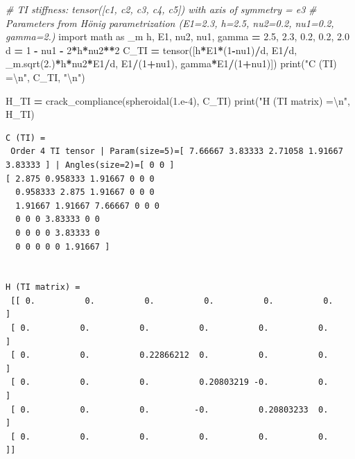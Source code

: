 \documentclass[
  a4paper,
  numbers=noendperiod,
  DIV=12]{scrreprt}
\newenvironment{Shaded}{\begin{snugshade}}{\end{snugshade}}
\newcommand{\BuiltInTok}[1]{#1}
\newcommand{\CharTok}[1]{\textcolor[rgb]{0.31,0.60,0.02}{#1}}
\newcommand{\CommentTok}[1]{\textcolor[rgb]{0.56,0.35,0.01}{\textit{#1}}}
\newcommand{\DecValTok}[1]{\textcolor[rgb]{0.00,0.00,0.81}{#1}}
\newcommand{\FloatTok}[1]{\textcolor[rgb]{0.00,0.00,0.81}{#1}}
\newcommand{\ImportTok}[1]{#1}
\newcommand{\NormalTok}[1]{#1}
\newcommand{\OperatorTok}[1]{\textcolor[rgb]{0.81,0.36,0.00}{\textbf{#1}}}
\newcommand{\StringTok}[1]{\textcolor[rgb]{0.31,0.60,0.02}{#1}}
\begin{document}
\begin{Shaded}
\begin{Highlighting}[]
\CommentTok{\# TI stiffness: tensor([c1, c2, c3, c4, c5]) with axis of symmetry = e3}
\CommentTok{\# Parameters from Hönig parametrization (E1=2.3, h=2.5, nu2=0.2, nu1=0.2, gamma=2.)}
\ImportTok{import}\NormalTok{ math }\ImportTok{as}\NormalTok{ \_m}
\NormalTok{h, E1, nu2, nu1, gamma }\OperatorTok{=} \FloatTok{2.5}\NormalTok{, }\FloatTok{2.3}\NormalTok{, }\FloatTok{0.2}\NormalTok{, }\FloatTok{0.2}\NormalTok{, }\FloatTok{2.0}
\NormalTok{d }\OperatorTok{=} \DecValTok{1} \OperatorTok{{-}}\NormalTok{ nu1 }\OperatorTok{{-}} \DecValTok{2}\OperatorTok{*}\NormalTok{h}\OperatorTok{*}\NormalTok{nu2}\OperatorTok{**}\DecValTok{2}
\NormalTok{C\_TI }\OperatorTok{=}\NormalTok{ tensor([h}\OperatorTok{*}\NormalTok{E1}\OperatorTok{*}\NormalTok{(}\DecValTok{1}\OperatorTok{{-}}\NormalTok{nu1)}\OperatorTok{/}\NormalTok{d, E1}\OperatorTok{/}\NormalTok{d, \_m.sqrt(}\FloatTok{2.}\NormalTok{)}\OperatorTok{*}\NormalTok{h}\OperatorTok{*}\NormalTok{nu2}\OperatorTok{*}\NormalTok{E1}\OperatorTok{/}\NormalTok{d, E1}\OperatorTok{/}\NormalTok{(}\DecValTok{1}\OperatorTok{+}\NormalTok{nu1), gamma}\OperatorTok{*}\NormalTok{E1}\OperatorTok{/}\NormalTok{(}\DecValTok{1}\OperatorTok{+}\NormalTok{nu1)])}
\BuiltInTok{print}\NormalTok{(}\StringTok{"C (TI) =}\CharTok{\textbackslash{}n}\StringTok{"}\NormalTok{, C\_TI, }\StringTok{"}\CharTok{\textbackslash{}n}\StringTok{"}\NormalTok{)}

\NormalTok{H\_TI }\OperatorTok{=}\NormalTok{ crack\_compliance(spheroidal(}\FloatTok{1.e{-}4}\NormalTok{), C\_TI)}
\BuiltInTok{print}\NormalTok{(}\StringTok{"H (TI matrix) =}\CharTok{\textbackslash{}n}\StringTok{"}\NormalTok{, H\_TI)}
\end{Highlighting}
\end{Shaded}

\begin{verbatim}
C (TI) =
 Order 4 TI tensor | Param(size=5)=[ 7.66667 3.83333 2.71058 1.91667 3.83333 ] | Angles(size=2)=[ 0 0 ]
[ 2.875 0.958333 1.91667 0 0 0 
  0.958333 2.875 1.91667 0 0 0 
  1.91667 1.91667 7.66667 0 0 0 
  0 0 0 3.83333 0 0 
  0 0 0 0 3.83333 0 
  0 0 0 0 0 1.91667 ]
 

H (TI matrix) =
 [[ 0.          0.          0.          0.          0.          0.        ]
 [ 0.          0.          0.          0.          0.          0.        ]
 [ 0.          0.          0.22866212  0.          0.          0.        ]
 [ 0.          0.          0.          0.20803219 -0.          0.        ]
 [ 0.          0.          0.         -0.          0.20803233  0.        ]
 [ 0.          0.          0.          0.          0.          0.        ]]
\end{verbatim}
\end{document}
